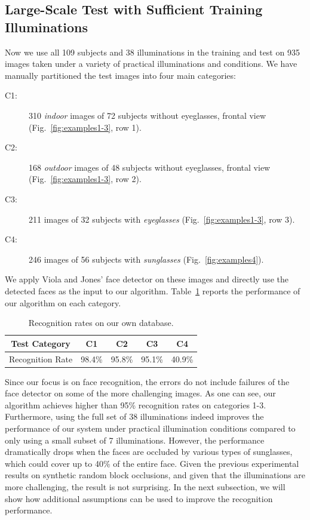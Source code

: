 \documentclass[12pt,journal,draftcls,letterpaper,onecolumn]{IEEEtran}
\begin{document}
\subsection{Large-Scale Test with Sufficient Training
Illuminations} Now we use all 109 subjects and 38 illuminations
in the training and test on 935 images taken under a variety of
practical illuminations and conditions. We have manually partitioned the test images into four main
categories:
\begin{description}
\item[C1:] 310 \emph{indoor} images of 72 subjects without
    eyeglasses, frontal view
    (Fig.~\ref{fig:examples1-3}, row 1).
\item[C2:] 168 \emph{outdoor} images of 48 subjects without
    eyeglasses, frontal view
    (Fig.~\ref{fig:examples1-3}, row 2).
\item[C3:] 211 images of 32 subjects with \emph{eyeglasses}
    (Fig.~\ref{fig:examples1-3}, row 3).
\item[C4:] 246 images of 56 subjects with \emph{sunglasses}
    (Fig.~\ref{fig:examples4}).
\end{description}
We apply Viola and Jones' face detector on these images and
directly use the detected faces as the input to our algorithm.
Table~\ref{tab:UIUC-recognition} reports the performance of our
algorithm on each category.
\begin{table}	
\centering \caption{Recognition rates on our own database.}
\begin{tabular}{|c|c|c|c|c| }
\hline
Test Category & C1 & C2 & C3 & C4  \\
\hline
\hline
Recognition Rate & 98.4\% & 95.8\% & 95.1\% & 40.9\% \\
\hline
\end{tabular}
\label{tab:UIUC-recognition}
\vspace{-.25in}
\end{table}
Since our focus is on face
recognition, the errors do not include failures of the face
detector on some of the more challenging images.
As one can see, our algorithm achieves higher than 95\%
recognition rates on categories 1-3. Furthermore, using the
full set of 38 illuminations indeed improves the performance of
our system under practical illumination conditions compared to
only using a small subset of 7 illuminations. However, the
performance dramatically drops when the faces are occluded by
various types of sunglasses, which could cover up to 40\% of
the entire face. Given the previous experimental results on
synthetic random block occlusions, and given that the
illuminations are more challenging, the result is not
surprising. In the next subsection, we will show how additional
assumptions can be used to improve the recognition performance.
\end{document}

